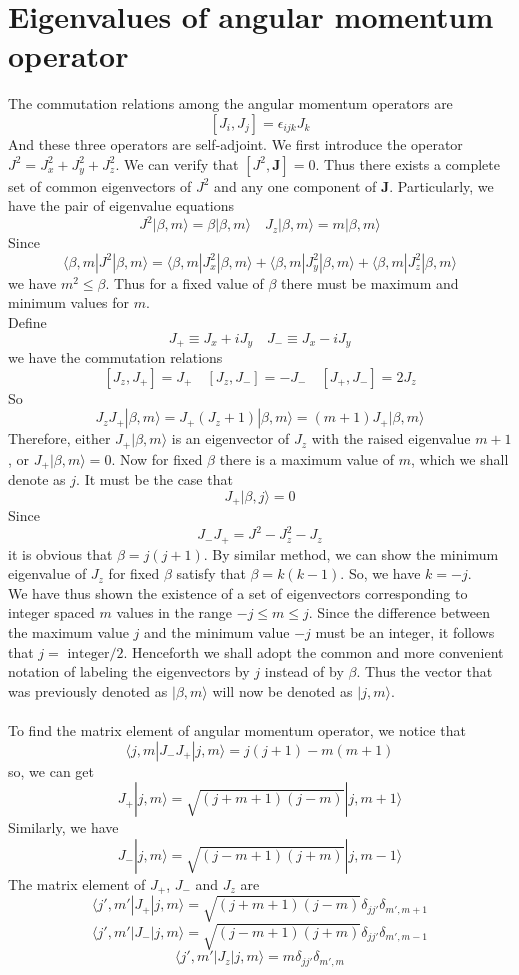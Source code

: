 \section{Eigenvalues of angular momentum operator}
The commutation relations among the angular momentum operators are
\[[J_i,J_j] = \epsilon_{ijk} J_k\]
And these three operators are self-adjoint. We first introduce the operator $J^2 = J_x^2 + J_y^2 + J_z^2$. We can verify that $[J^2,\bm{J}] = 0$. Thus there exists a complete set of common eigenvectors of $J^2$ and any one component of $\bm{J}$. Particularly, we have the pair of eigenvalue equations
\[J^2 | \beta,m\rangle = \beta | \beta,m\rangle \quad J_z | \beta,m\rangle = m | \beta,m\rangle\]
Since
\[\langle \beta,m | J^2 | \beta,m \rangle = \langle \beta,m | J_x^2 | \beta,m \rangle + \langle \beta,m | J_y^2 | \beta,m \rangle + \langle \beta,m | J_z^2 | \beta,m \rangle\]
we have $m^2 \leq \beta$. Thus for a fixed value of $\beta$ there must be maximum and minimum values for $m$.\\
Define
\[J_+ \equiv J_x + iJ_y \quad J_- \equiv J_x - iJ_y\]
we have the commutation relations
\[[J_z,J_+] = J_+ \quad [J_z,J_-] = -J_- \quad [J_+,J_-] = 2J_z\]
So
\[J_z J_+ | \beta,m\rangle = J_+(J_z + 1)| \beta,m\rangle = (m+1)J_+| \beta,m\rangle\]
Therefore, either $J_+ | \beta,m\rangle$ is an eigenvector of $J_z$ with the raised eigenvalue $m+1$, or $J_+ | \beta,m\rangle = 0$. Now for fixed $\beta$ there is a maximum value of $m$, which we shall denote as $j$. It must be the case that
\[J_+ |\beta,j\rangle = 0\]
Since
\[J_- J_+ = J^2 - J_z^2 - J_z\]
it is obvious that $\beta = j(j+1)$. By similar method, we can show the minimum eigenvalue of $J_z$ for fixed $\beta$ satisfy that $\beta = k(k-1)$. So, we have $k = -j$. \\
We have thus shown the existence of a set of eigenvectors corresponding to integer spaced $m$ values in the range $-j \leq m \leq j$. Since the difference between the maximum value $j$ and the minimum value $-j$ must be an integer, it follows that $j = \mbox{ integer} / 2$. Henceforth we shall adopt the common and more convenient notation of labeling the eigenvectors by $j$ instead of by $\beta$. Thus the vector that was previously denoted as $|\beta,m\rangle$ will now be denoted as $|j,m\rangle$. \\ \\
To find the matrix element of angular momentum operator, we notice that
\[\langle j,m| J_-J_+|j,m\rangle = j(j+1)-m(m+1)\]
so, we can get
\[J_+ |j,m\rangle = \sqrt{(j+m+1)(j-m)} |j,m+1\rangle\]
Similarly, we have
\[J_- |j,m\rangle = \sqrt{(j-m+1)(j+m)} |j,m-1\rangle\]
The matrix element of $J_+$, $J_-$ and $J_z$ are
\[\langle j',m'| J_+ | j,m\rangle = \sqrt{(j+m+1)(j-m)} \delta_{jj'}\delta_{m',m+1}\]
\[\langle j',m'| J_- | j,m\rangle = \sqrt{(j-m+1)(j+m)} \delta_{jj'}\delta_{m',m-1}\]
\[\langle j',m'| J_z | j,m\rangle = m \delta_{jj'}\delta_{m',m}\]

